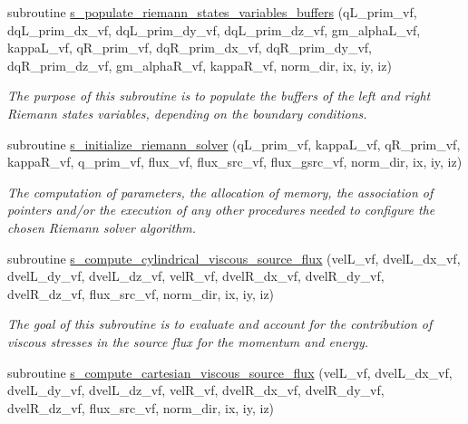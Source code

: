 \begin{DoxyCompactItemize}
subroutine \hyperlink{namespacem__riemann__solvers_ae82ad8216dcc6938b86cf0bd5c17467b}{s\+\_\+populate\+\_\+riemann\+\_\+states\+\_\+variables\+\_\+buffers} (q\+L\+\_\+prim\+\_\+vf, dq\+L\+\_\+prim\+\_\+dx\+\_\+vf, dq\+L\+\_\+prim\+\_\+dy\+\_\+vf, dq\+L\+\_\+prim\+\_\+dz\+\_\+vf, gm\+\_\+alpha\+L\+\_\+vf, kappa\+L\+\_\+vf, q\+R\+\_\+prim\+\_\+vf, dq\+R\+\_\+prim\+\_\+dx\+\_\+vf, dq\+R\+\_\+prim\+\_\+dy\+\_\+vf, dq\+R\+\_\+prim\+\_\+dz\+\_\+vf, gm\+\_\+alpha\+R\+\_\+vf, kappa\+R\+\_\+vf, norm\+\_\+dir, ix, iy, iz)
\begin{DoxyCompactList}\small\item\em The purpose of this subroutine is to populate the buffers of the left and right Riemann states variables, depending on the boundary conditions. \end{DoxyCompactList}\item 
subroutine \hyperlink{namespacem__riemann__solvers_a86766279fcf7527f2b148adff4666b1c}{s\+\_\+initialize\+\_\+riemann\+\_\+solver} (q\+L\+\_\+prim\+\_\+vf, kappa\+L\+\_\+vf, q\+R\+\_\+prim\+\_\+vf, kappa\+R\+\_\+vf, q\+\_\+prim\+\_\+vf, flux\+\_\+vf, flux\+\_\+src\+\_\+vf, flux\+\_\+gsrc\+\_\+vf, norm\+\_\+dir, ix, iy, iz)
\begin{DoxyCompactList}\small\item\em The computation of parameters, the allocation of memory, the association of pointers and/or the execution of any other procedures needed to configure the chosen Riemann solver algorithm. \end{DoxyCompactList}\item 
subroutine \hyperlink{namespacem__riemann__solvers_a50ff087624d23846c62cd711dd003757}{s\+\_\+compute\+\_\+cylindrical\+\_\+viscous\+\_\+source\+\_\+flux} (vel\+L\+\_\+vf, dvel\+L\+\_\+dx\+\_\+vf, dvel\+L\+\_\+dy\+\_\+vf, dvel\+L\+\_\+dz\+\_\+vf, vel\+R\+\_\+vf, dvel\+R\+\_\+dx\+\_\+vf, dvel\+R\+\_\+dy\+\_\+vf, dvel\+R\+\_\+dz\+\_\+vf, flux\+\_\+src\+\_\+vf, norm\+\_\+dir, ix, iy, iz)
\begin{DoxyCompactList}\small\item\em The goal of this subroutine is to evaluate and account for the contribution of viscous stresses in the source flux for the momentum and energy. \end{DoxyCompactList}\item 
subroutine \hyperlink{namespacem__riemann__solvers_a58c0a2ab06eb5094f60c5e68dbde7300}{s\+\_\+compute\+\_\+cartesian\+\_\+viscous\+\_\+source\+\_\+flux} (vel\+L\+\_\+vf, dvel\+L\+\_\+dx\+\_\+vf, dvel\+L\+\_\+dy\+\_\+vf, dvel\+L\+\_\+dz\+\_\+vf, vel\+R\+\_\+vf, dvel\+R\+\_\+dx\+\_\+vf, dvel\+R\+\_\+dy\+\_\+vf, dvel\+R\+\_\+dz\+\_\+vf, flux\+\_\+src\+\_\+vf, norm\+\_\+dir, ix, iy, iz)

\end{DoxyCompactItemize}
